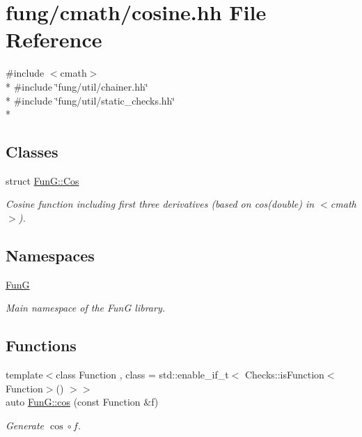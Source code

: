 \hypertarget{cosine_8hh}{}\section{fung/cmath/cosine.hh File Reference}
\label{cosine_8hh}
{\ttfamily \#include $<$cmath$>$}\\*
{\ttfamily \#include \char`\"{}fung/util/chainer.\+hh\char`\"{}}\\*
{\ttfamily \#include \char`\"{}fung/util/static\+\_\+checks.\+hh\char`\"{}}\\*
\subsection*{Classes}
\begin{DoxyCompactItemize}
\item 
struct \hyperlink{structFunG_1_1Cos}{Fun\+G\+::\+Cos}
\begin{DoxyCompactList}\small\item\em Cosine function including first three derivatives (based on cos(double) in $<$cmath$>$). \end{DoxyCompactList}\end{DoxyCompactItemize}
\subsection*{Namespaces}
\begin{DoxyCompactItemize}
\item 
 \hyperlink{namespaceFunG}{FunG}
\begin{DoxyCompactList}\small\item\em Main namespace of the FunG library. \end{DoxyCompactList}\end{DoxyCompactItemize}
\subsection*{Functions}
\begin{DoxyCompactItemize}
\item 
{\footnotesize template$<$class Function , class  = std\+::enable\+\_\+if\+\_\+t$<$ Checks\+::is\+Function$<$\+Function$>$() $>$$>$ }\\auto \hyperlink{group__CMathGroup_ga7e9b2ac717cd2350663293cb66ba6cbd}{Fun\+G\+::cos} (const Function \&f)
\begin{DoxyCompactList}\small\item\em Generate $ \cos\circ f $. \end{DoxyCompactList}\end{DoxyCompactItemize}
